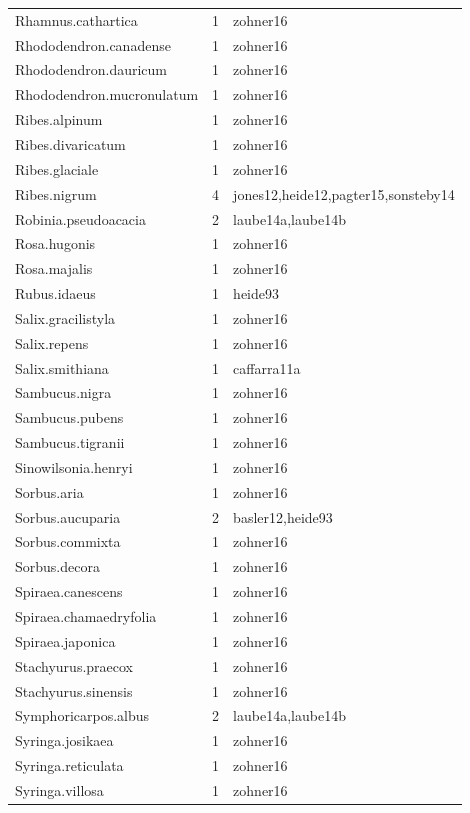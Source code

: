 \documentclass{article}
\begin{document}
\begin{footnotesize}
\begin{table}[ht]
\begin{tabular}{|p{}|p{}|p{}|}
  Rhamnus.cathartica &   1 & zohner16 \\ 
  Rhododendron.canadense &   1 & zohner16 \\ 
  Rhododendron.dauricum &   1 & zohner16 \\ 
  Rhododendron.mucronulatum &   1 & zohner16 \\ 
  Ribes.alpinum &   1 & zohner16 \\ 
  Ribes.divaricatum &   1 & zohner16 \\ 
  Ribes.glaciale &   1 & zohner16 \\ 
  Ribes.nigrum &   4 & jones12,heide12,pagter15,sonsteby14 \\ 
  Robinia.pseudoacacia &   2 & laube14a,laube14b \\ 
  Rosa.hugonis &   1 & zohner16 \\ 
  Rosa.majalis &   1 & zohner16 \\ 
  Rubus.idaeus &   1 & heide93 \\ 
  Salix.gracilistyla &   1 & zohner16 \\ 
  Salix.repens &   1 & zohner16 \\ 
  Salix.smithiana &   1 & caffarra11a \\ 
  Sambucus.nigra &   1 & zohner16 \\ 
  Sambucus.pubens &   1 & zohner16 \\ 
  Sambucus.tigranii &   1 & zohner16 \\ 
  Sinowilsonia.henryi &   1 & zohner16 \\ 
  Sorbus.aria &   1 & zohner16 \\ 
  Sorbus.aucuparia &   2 & basler12,heide93 \\ 
  Sorbus.commixta &   1 & zohner16 \\ 
  Sorbus.decora &   1 & zohner16 \\ 
  Spiraea.canescens &   1 & zohner16 \\ 
  Spiraea.chamaedryfolia &   1 & zohner16 \\ 
  Spiraea.japonica &   1 & zohner16 \\ 
  Stachyurus.praecox &   1 & zohner16 \\ 
  Stachyurus.sinensis &   1 & zohner16 \\ 
  Symphoricarpos.albus &   2 & laube14a,laube14b \\ 
  Syringa.josikaea &   1 & zohner16 \\ 
  Syringa.reticulata &   1 & zohner16 \\ 
  Syringa.villosa &   1 & zohner16 \\ 

\end{tabular}
\end{table}
\end{footnotesize}
\end{document}
